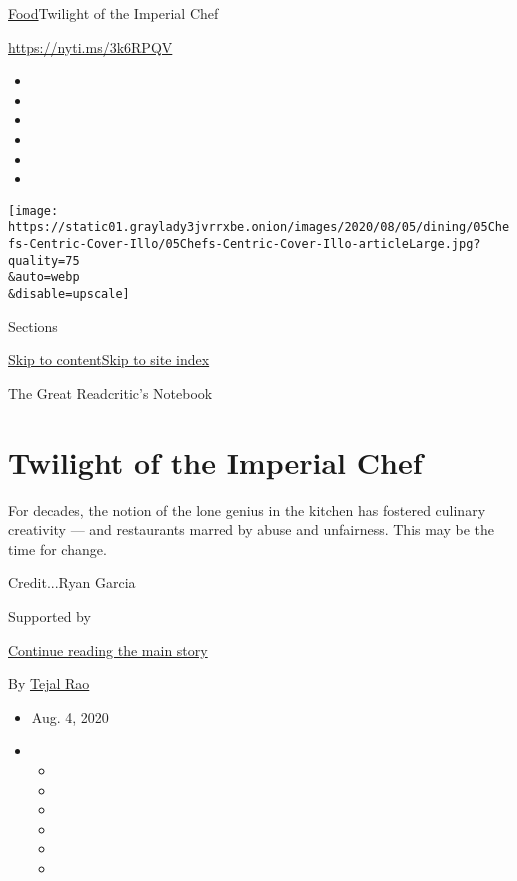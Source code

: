 \href{/section/food}{Food}\textbar{}Twilight of the Imperial Chef

\href{https://nyti.ms/3k6RPQV}{https://nyti.ms/3k6RPQV}

\begin{itemize}
\item
\item
\item
\item
\item
\item
\end{itemize}

\texttt{[image: https://static01.graylady3jvrrxbe.onion/images/2020/08/05/dining/05Chefs-Centric-Cover-Illo/05Chefs-Centric-Cover-Illo-articleLarge.jpg?quality=75\\\&auto=webp\\\&disable=upscale]}

Sections

\protect\hyperlink{site-content}{Skip to
content}\protect\hyperlink{site-index}{Skip to site index}

The Great Readcritic's Notebook

\hypertarget{twilight-of-the-imperial-chef}{%
\section{Twilight of the Imperial
Chef}\label{twilight-of-the-imperial-chef}}

For decades, the notion of the lone genius in the kitchen has fostered
culinary creativity --- and restaurants marred by abuse and unfairness.
This may be the time for change.

Credit...Ryan Garcia

Supported by

\protect\hyperlink{after-sponsor}{Continue reading the main story}

By \href{https://www.nytimes3xbfgragh.onion/by/tejal-rao}{Tejal Rao}

\begin{itemize}
\item
  Aug. 4, 2020
\item
  \begin{itemize}
  \item
  \item
  \item
  \item
  \item
  \item
  \end{itemize}
\end{itemize}

